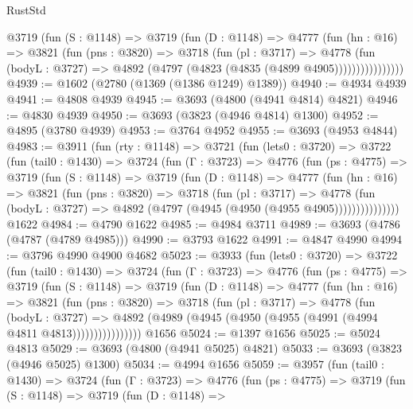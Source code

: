 \begin{lexlean}{RustStd}
\begin{coremodule}
              @3719
                (fun (S : @1148) =>
                @3719
                  (fun (D : @1148) =>
                  @4777
                    (fun (hn : @16) =>
                    @3821
                      (fun (pns : @3820) =>
                      @3718
                        (fun (pl : @3717) =>
                        @4778
                          (fun (bodyL : @3727) =>
                          @4892 (@4797 (@4823 (@4835 (@4899 @4905))))))))))))))))
@4939 := @1602 (@2780 (@1369 (@1386 @1249) @1389))
@4940 := @4934 @4939
@4941 := @4808 @4939
@4945 := @3693 (@4800 (@4941 @4814) @4821)
@4946 := @4830 @4939
@4950 := @3693 (@3823 (@4946 @4814) @1300)
@4952 := @4895 (@3780 @4939)
@4953 := @3764 @4952
@4955 := @3693 (@4953 @4844)
@4983 := @3911
    (fun (rty : @1148) =>
    @3721
      (fun (lets0 : @3720) =>
      @3722
        (fun (tail0 : @1430) =>
        @3724
          (fun (Γ : @3723) =>
          @4776
            (fun (ps : @4775) =>
            @3719
              (fun (S : @1148) =>
              @3719
                (fun (D : @1148) =>
                @4777
                  (fun (hn : @16) =>
                  @3821
                    (fun (pns : @3820) =>
                    @3718
                      (fun (pl : @3717) =>
                      @4778
                        (fun (bodyL : @3727) =>
                        @4892 (@4797 (@4945 (@4950 (@4955 @4905)))))))))))))))
    @1622
@4984 := @4790 @1622
@4985 := @4984 @3711
@4989 := @3693 (@4786 (@4787 (@4789 @4985)))
@4990 := @3793 @1622
@4991 := @4847 @4990
@4994 := @3796 @4990 @4900 @4682
@5023 := @3933
    (fun (lets0 : @3720) =>
    @3722
      (fun (tail0 : @1430) =>
      @3724
        (fun (Γ : @3723) =>
        @4776
          (fun (ps : @4775) =>
          @3719
            (fun (S : @1148) =>
            @3719
              (fun (D : @1148) =>
              @4777
                (fun (hn : @16) =>
                @3821
                  (fun (pns : @3820) =>
                  @3718
                    (fun (pl : @3717) =>
                    @4778
                      (fun (bodyL : @3727) =>
                      @4892 (@4989 (@4945 (@4950 (@4955 (@4991 (@4994 @4811 @4813))))))))))))))))
    @1656
@5024 := @1397 @1656
@5025 := @5024 @4813
@5029 := @3693 (@4800 (@4941 @5025) @4821)
@5033 := @3693 (@3823 (@4946 @5025) @1300)
@5034 := @4994 @1656
@5059 := @3957
    (fun (tail0 : @1430) =>
    @3724
      (fun (Γ : @3723) =>
      @4776
        (fun (ps : @4775) =>
        @3719
          (fun (S : @1148) =>
          @3719
            (fun (D : @1148) =>

\end{coremodule}
\end{lexlean}
